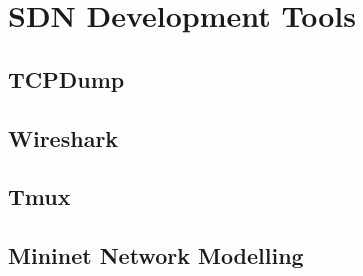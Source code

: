\chapter{SDN Development Tools}

\section{TCPDump}
 \label{sdn_development_tools:tcpdump}

\section{Wireshark}

\section{Tmux}

\section{Mininet Network Modelling}

